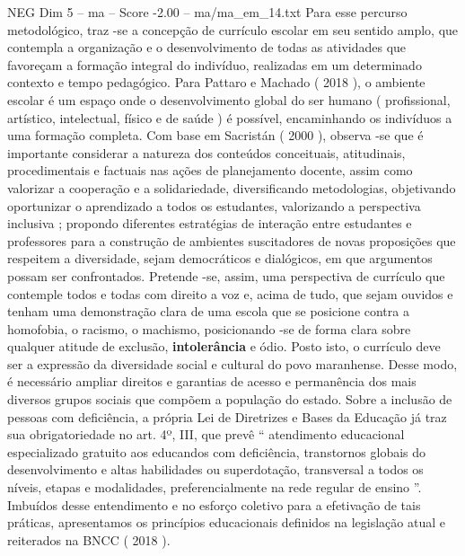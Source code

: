 \begin{textsample}{NEG Dim 5 – ma – Score -2.00 – ma/ma\_em\_14.txt}
Para esse percurso metodológico, traz -se a concepção de currículo escolar em seu sentido amplo, que contempla a organização e o desenvolvimento de todas as atividades que favoreçam a formação integral do indivíduo, realizadas em um determinado contexto e tempo pedagógico.
Para Pattaro e Machado ( 2018 ), o ambiente escolar é um espaço onde o desenvolvimento global do ser humano ( profissional, artístico, intelectual, físico e de saúde ) é possível, encaminhando os indivíduos a uma formação completa.
Com base em Sacristán ( 2000 ), observa -se que é importante considerar a natureza dos conteúdos conceituais, atitudinais, procedimentais e factuais nas ações de planejamento docente, assim como valorizar a cooperação e a solidariedade, diversificando metodologias, objetivando oportunizar o aprendizado a todos os estudantes, valorizando a perspectiva inclusiva ; propondo diferentes estratégias de interação entre estudantes e professores para a construção de ambientes suscitadores de novas proposições que respeitem a diversidade, sejam democráticos e dialógicos, em que argumentos possam ser confrontados.
Pretende -se, assim, uma perspectiva de currículo que contemple todos e todas com direito a voz e, acima de tudo, que sejam ouvidos e tenham uma demonstração clara de uma escola que se posicione contra a homofobia, o racismo, o machismo, posicionando -se de forma clara sobre qualquer atitude de exclusão, \textbf{intolerância} e ódio.
Posto isto, o currículo deve ser a expressão da diversidade social e cultural do povo maranhense.
Desse modo, é necessário ampliar direitos e garantias de acesso e permanência dos mais diversos grupos sociais que compõem a população do estado.
Sobre a inclusão de pessoas com deficiência, a própria Lei de Diretrizes e Bases da Educação já traz sua obrigatoriedade no art. 4º, III, que prevê “ atendimento educacional especializado gratuito aos educandos com deficiência, transtornos globais do desenvolvimento e altas habilidades ou superdotação, transversal a todos os níveis, etapas e modalidades, preferencialmente na rede regular de ensino ”.
Imbuídos desse entendimento e no esforço coletivo para a efetivação de tais práticas, apresentamos os princípios educacionais definidos na legislação atual e reiterados na BNCC ( 2018 ).

\end{textsample}
